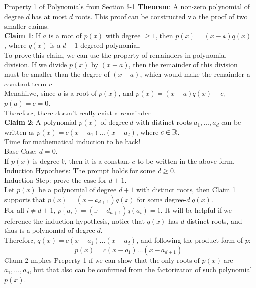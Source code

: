 \begin{ln-theorem}{Property 1 of Polynomials from Section 8-1}{}
    \textbf{Theorem}: A non-zero polynomial of degree $d$ has at most $d$ roots.
    \tcblower
    This proof can be constructed via the proof of two smaller claims. \\
    \textbf{Claim 1}: If $a$ is a root of $p(x)$ with degree $\geq 1$, then $p(x) = (x - a)q(x)$, where $q(x)$ is a $d-1$-degreed polynomial. \\
    To prove this claim, we can use the property of remainders in polynomial division. If we divide $p(x)$ by $(x - a)$, then the remainder of this division must be smaller than the degree of $(x - a)$, which would make the remainder a constant term $c$. \\
    Menahilwe, since $a$ is a root of $p(x)$, and $p(x) = (x - a)q(x) + c$, $p(a) = c = 0$. \\
    Therefore, there doesn't really exist a remainder. \\
    \textbf{Claim 2}: A polynomial $p(x)$ of degree $d$ with distinct roots $a_1, \dots, a_d$ can be written as $p(x) = c(x - a_1)\dots(x - a_d)$, where $c \in \mathbb{R}$. \\
    Time for mathematical induction to be back! \\
    Base Case: $d = 0$. \\
    If $p(x)$ is degree-0, then it is a constant $c$ to be written in the above form. \\
    Induction Hypothesis: The prompt holds for some $d \geq 0$. \\
    Induction Step: prove the case for $d + 1$. \\
    Let $p(x)$ be a polynomial of degree $d + 1$ with distinct roots, then Claim 1 supports that $p(x) = (x - a_{d + 1})q(x)$ for some degree-$d$ $q(x)$. \\
    For all $i \neq d + 1$, $p(a_i) = (x - d_{a + 1})q(a_i) = 0$. It will be helpful if we reference the induction hypothesis, notice that $q(x)$ has $d$ distinct roots, and thus is a polynomial of degree $d$. \\
    Therefore, $q(x) = c(x - a_1)\dots(x - a_d)$, and following the product form of $p$:
    \[p(x) = c(x - a_1)\dots(x - a_{d + 1})\]
    Claim 2 implies Property 1 if we can show that the only roots of $p(x)$ are $a_1, \dots, a_d$, but that also can be confirmed from the factorizaton of such polynomial $p(x)$.
\end{ln-theorem}

